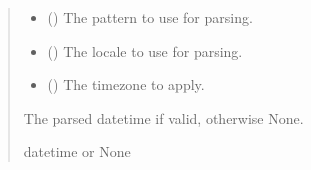 \documentclass[letterpaper,10pt,english]{sphinxmanual}
\begin{document}
\begin{fulllineitems}
\begin{fulllineitems}
\begin{quote}
\begin{description}
\begin{itemize}
\item {} 
\sphinxAtStartPar
{} (\sphinxstyleliteralemphasis{\sphinxupquote{, }}) \textendash{} The pattern to use for parsing.

\item {} 
\sphinxAtStartPar
{} (\sphinxstyleliteralemphasis{\sphinxupquote{, }}) \textendash{} The locale to use for parsing.

\item {} 
\sphinxAtStartPar
{} (\sphinxstyleliteralemphasis{\sphinxupquote{, }}) \textendash{} The timezone to apply.

\end{itemize}

\sphinxAtStartPar
The parsed datetime if valid, otherwise None.

\sphinxAtStartPar
datetime or None

\end{description}\end{quote}

\end{fulllineitems}


\end{fulllineitems}
\end{document}

